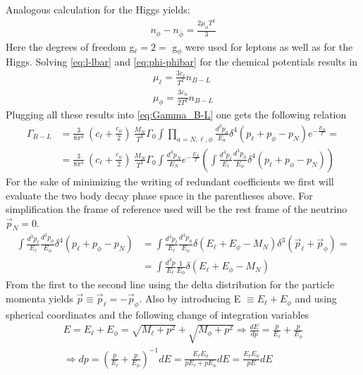 Analogous calculation for the Higgs yields:
\begin{align*}
	n_\phi-n_{\bar{\phi}}=\frac{2\mu_\phi T^2}{3}
\end{align*}
Here the degrees of freedom g$_\ell=2=$ g$_\phi$ were used for leptons as well as for the Higgs. \newline
Solving \ref{eq:l-lbar} and \ref{eq:phi-phibar} for the chemical potentials results in
\begin{align*}
	\mu_\ell=\frac{3c_\ell}{T^2}n_{B-L}\\
	\mu_\phi=\frac{3c_\phi}{2T^2}n_{B-L}
\end{align*}
Plugging all these results into \ref{eq:Gamma_B-L} one gets the following relation
\begin{align*}
	\Gamma_{B-L}&=\frac{3}{8\pi^4}\:\left(c_\ell+\frac{c_\phi}{2}\right)\:\frac{M_N}{T^3}\Gamma_0\int\prod_{a=N,\ell,\phi}\frac{d^3p_a}{E_a}\delta^4\left(p_\ell+p_\phi-p_N\right)e^{-\frac{E_N}{T}}=\\
	&=\frac{3}{8\pi^4}\:\left(c_\ell+\frac{c_\phi}{2}\right)\:\frac{M_N}{T^3}\Gamma_0\int \frac{d^3p_N}{E_N}e^{-\frac{E_N}{T}}\left(\int\frac{d^3p_\ell}{E_\ell}\frac{d^3p_\phi}{E_\phi}\delta^4\left(p_\ell+p_\phi-p_N\right)\right)
\end{align*}
For the sake of minimizing the writing of redundant coefficients we first will evaluate the two body decay phase space in the parentheses above. For simplification the frame of reference used will be the rest frame of the neutrino $\vec{p}_N=0$.
\begin{align*}
\int\frac{d^3p_\ell}{E_\ell}\frac{d^3p_\phi}{E_\phi}\delta^4\left(p_\ell+p_\phi-p_N\right)&=\int\frac{d^3p_\ell}{E_\ell}\frac{d^3p_\phi}{E_\phi}\delta\left(E_\ell+E_\phi-M_N\right)\delta^3\left(\vec{p}_\ell+\vec{p}_\phi\right)=\\
&=\int\frac{d^3p}{E_\ell}\frac{1}{E_\phi}\delta\left(E_\ell+E_\phi-M_N\right)
\end{align*}
From the first to the second line using the delta distribution for the particle momenta yields $\vec{p}\equiv\vec{p}_\ell=-\vec{p}_\phi$. Also by introducing E $\equiv E_\ell+E_\phi$ and using spherical coordinates and the following change of integration variables
\begin{align*}
	E=E_\ell+E_\phi=\sqrt{M_\ell+p^2}+\sqrt{M_\phi+p^2} \Longrightarrow \frac{dE}{dp}=\frac{p}{E_\ell}+\frac{p}{E_\phi} \\
	\Longrightarrow dp=\left(\frac{p}{E_l}+\frac{p}{E_\phi}\right)^{-1}dE=\frac{E_\ell E_\phi}{pE_\ell+pE_\phi}dE=\frac{E_\ell E_\phi}{pE}dE
\end{align*}
